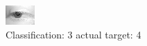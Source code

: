 \begin{figure}[h!]
\begin{center}
\includegraphics[width=0.60\columnwidth]{figures/ID2698_class_3_target_4.png}
\end{center}
\caption{ Classification: 3 actual target: 4}
\label{fig:ID2698_class_3_target_4}
\end{figure}
